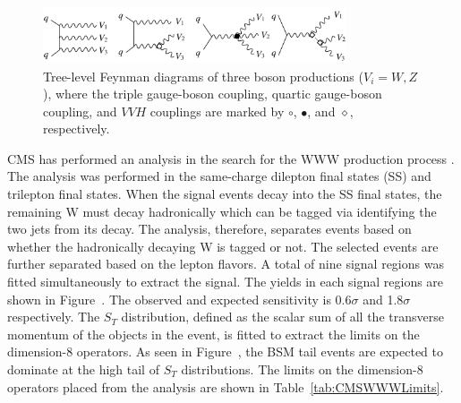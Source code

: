\begin{figure}[thb]
\begin{center}
\includegraphics[width=0.8\textwidth]{FeynmanDiagram.pdf}
\caption{
\label{fig:feynman}
Tree-level Feynman diagrams of three boson productions ($V_{i} = W, Z$), where the triple gauge-boson coupling, quartic gauge-boson coupling, and $VVH$ couplings are marked by $\circ$, $\bullet$, and $\diamond$, respectively.
}
\end{center}
\end{figure}

CMS has performed an analysis in the search for the WWW production process \cite{CMS:2019mpq}.
The analysis was performed in the same-charge dilepton final states (SS) and trilepton final states.
When the signal events decay into the SS final states, the remaining W must decay hadronically which can be tagged via identifying the two jets from its decay.
The analysis, therefore, separates events based on whether the hadronically decaying W is tagged or not.
The selected events are further separated based on the lepton flavors.
A total of nine signal regions was fitted simultaneously to extract the signal.
The yields in each signal regions are shown in Figure~.
The observed and expected sensitivity is 0.6$\sigma$ and 1.8$\sigma$ respectively.
The $S_{T}$ distribution, defined as the scalar sum of all the transverse momentum of the objects in the event, is fitted to extract the limits on the dimension-8 operators.
As seen in Figure~, the BSM tail events are expected to dominate at the high tail of $S_{T}$ distributions.
The limits on the dimension-8 operators placed from the analysis are shown in Table~\ref{tab:CMSWWWLimits}.

